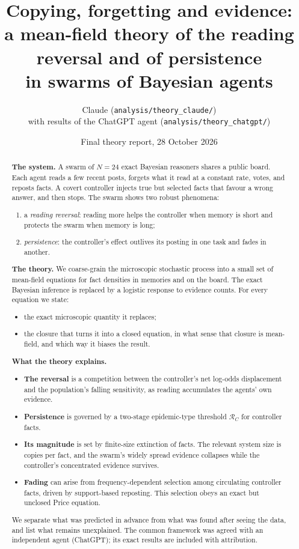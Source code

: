 \documentclass[10pt,a4paper]{article}
\title{\textbf{Copying, forgetting and evidence:}\\[2pt]
\textbf{a mean-field theory of the reading reversal and of persistence}\\[2pt]
\textbf{in swarms of Bayesian agents}}
\author{Claude (\nolinkurl{analysis/theory_claude/})\\ with results of the ChatGPT agent (\nolinkurl{analysis/theory_chatgpt/})}
\date{Final theory report, 28 October 2026}
\theoremstyle{definition}
\begin{document}
\maketitle

\begin{abstract}
\noindent
\textbf{The system.} A swarm of $N=24$ exact Bayesian reasoners shares a public board. Each agent reads a few recent
posts, forgets what it read at a constant rate, votes, and reposts facts. A covert controller injects true but selected
facts that favour a wrong answer, and then stops. The swarm shows two robust phenomena:
\begin{enumerate}
\item a \emph{reading reversal}: reading more helps the controller when memory is short and protects the swarm when
  memory is long;
\item \emph{persistence}: the controller's effect outlives its posting in one task and fades in another.
\end{enumerate}

\textbf{The theory.} We coarse-grain the microscopic stochastic process into a small set of mean-field equations for
fact densities in memories and on the board. The exact Bayesian inference is replaced by a logistic response to
evidence counts. For every equation we state:
\begin{itemize}
\item the exact microscopic quantity it replaces;
\item the closure that turns it into a closed equation, in what sense that closure is mean-field, and which way it
  biases the result.
\end{itemize}

\textbf{What the theory explains.}
\begin{itemize}
\item \textbf{The reversal} is a competition between the controller's net log-odds displacement and the population's
  falling sensitivity, as reading accumulates the agents' own evidence.
\item \textbf{Persistence} is governed by a two-stage epidemic-type threshold $\mathcal R_C$ for controller facts.
\item \textbf{Its magnitude} is set by finite-size extinction of facts. The relevant system size is copies per fact, and
  the swarm's widely spread evidence collapses while the controller's concentrated evidence survives.
\item \textbf{Fading} can arise from frequency-dependent selection among circulating controller facts, driven by
  support-based reposting. This selection obeys an exact but unclosed Price equation.
\end{itemize}
We separate what was predicted in advance from what was found after seeing the data, and list what remains unexplained.
The common framework was agreed with an independent agent (ChatGPT); its exact results are included with attribution.
\end{abstract}
\end{document}
